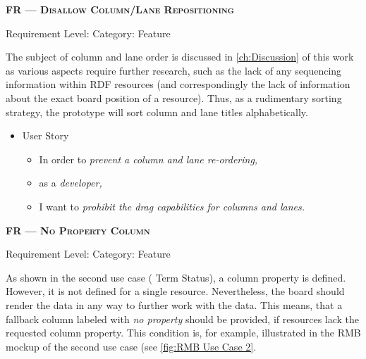 \centerline{\textbf{FR\textsubscript{} --- \textsc{Disallow Column/Lane Repositioning}}}

\centerline{\small Requirement Level:  \quad{} Category: Feature}

\noindent The subject of column and lane order is discussed in \autoref{ch:Discussion} of this work as various aspects require further research, such as the lack of any sequencing information within \acrshort*{RDF} resources (and correspondingly the lack of information about the exact board position of a resource). Thus, as a rudimentary sorting strategy, the prototype will sort column and lane titles alphabetically.


\begin{itemize}[after=\vspace{1em}]
    \setlength\itemsep{-0.5em}
	\item[] User Story\\[-7.8mm]
	\begin{itemize}
    \setlength\itemsep{-0.5em}
        \item[] In order to \textit{prevent a column and lane re-ordering,}
        \item[] as a \textit{developer,}
        \item[] I want to \textit{prohibit the drag capabilities for columns and lanes.}
    \end{itemize}
\end{itemize}









\centerline{\textbf{FR\textsubscript{} --- \textsc{No Property Column}}}
\centerline{\small Requirement Level:  \quad{} Category: Feature}

\noindent As shown in the second use case ( Term Status), a column property is defined. However, it is not defined for a single resource. Nevertheless, the board should render the data in any way to further work with the data. This means, that a fallback column labeled with \textit{no property} should be provided, if resources lack the requested column property. This condition is, for example, illustrated in the \acrshort*{RMB} mockup of the second use case (see \autoref{fig:RMB Use Case 2}.

